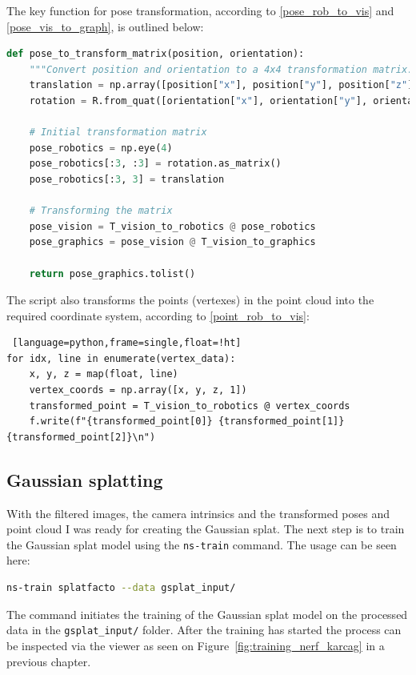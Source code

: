 The key function for pose transformation, according to \ref{pose_rob_to_vis} and \ref{pose_vis_to_graph}, is outlined below:
\FloatBarrier \begin{lstlisting}[language=python,frame=single,float=!ht]
def pose_to_transform_matrix(position, orientation):
    """Convert position and orientation to a 4x4 transformation matrix."""
    translation = np.array([position["x"], position["y"], position["z"]])
    rotation = R.from_quat([orientation["x"], orientation["y"], orientation["z"], orientation["w"]])
    
    # Initial transformation matrix
    pose_robotics = np.eye(4)
    pose_robotics[:3, :3] = rotation.as_matrix()
    pose_robotics[:3, 3] = translation

    # Transforming the matrix
    pose_vision = T_vision_to_robotics @ pose_robotics
    pose_graphics = pose_vision @ T_vision_to_graphics

    return pose_graphics.tolist()
\end{lstlisting}

The script also transforms the points (vertexes) in the point cloud into the required coordinate system, according to \ref{point_rob_to_vis}:

\begin{lstlisting} [language=python,frame=single,float=!ht]
for idx, line in enumerate(vertex_data):
    x, y, z = map(float, line)
    vertex_coords = np.array([x, y, z, 1])
    transformed_point = T_vision_to_robotics @ vertex_coords
    f.write(f"{transformed_point[0]} {transformed_point[1]} {transformed_point[2]}\n")
\end{lstlisting}

\subsection{Gaussian splatting}

With the filtered images, the camera intrinsics and the transformed poses and point cloud I was ready for creating the Gaussian splat. The next step is to train the Gaussian splat model using the \verb|ns-train| command. The usage can be seen here:
\FloatBarrier
\begin{lstlisting}[language=bash,frame=single,float=!ht]
ns-train splatfacto --data gsplat_input/
\end{lstlisting}
\FloatBarrier

The command initiates the training of the Gaussian splat model on the processed data in the \verb|gsplat_input/| folder. After the training has started the process can be inspected via the viewer as seen on Figure~\ref{fig:training_nerf_karcag} in a previous chapter.

